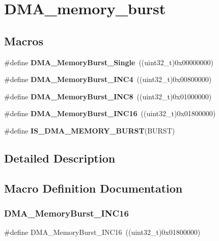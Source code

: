 \section{D\+M\+A\+\_\+memory\+\_\+burst}
\label{group__DMA__memory__burst}
\subsection*{Macros}
\begin{DoxyCompactItemize}
\item 
\#define \textbf{ D\+M\+A\+\_\+\+Memory\+Burst\+\_\+\+Single}~((uint32\+\_\+t)0x00000000)
\item 
\#define \textbf{ D\+M\+A\+\_\+\+Memory\+Burst\+\_\+\+I\+N\+C4}~((uint32\+\_\+t)0x00800000)
\item 
\#define \textbf{ D\+M\+A\+\_\+\+Memory\+Burst\+\_\+\+I\+N\+C8}~((uint32\+\_\+t)0x01000000)
\item 
\#define \textbf{ D\+M\+A\+\_\+\+Memory\+Burst\+\_\+\+I\+N\+C16}~((uint32\+\_\+t)0x01800000)
\item 
\#define \textbf{ I\+S\+\_\+\+D\+M\+A\+\_\+\+M\+E\+M\+O\+R\+Y\+\_\+\+B\+U\+R\+ST}(B\+U\+R\+ST)
\end{DoxyCompactItemize}


\subsection{Detailed Description}


\subsection{Macro Definition Documentation}
\mbox{\label{group__DMA__memory__burst_ga4ffd4960f794b187229fac1cea3d81c9}} 
\subsubsection{D\+M\+A\+\_\+\+Memory\+Burst\+\_\+\+I\+N\+C16}
{\footnotesize\ttfamily \#define D\+M\+A\+\_\+\+Memory\+Burst\+\_\+\+I\+N\+C16~((uint32\+\_\+t)0x01800000)}



